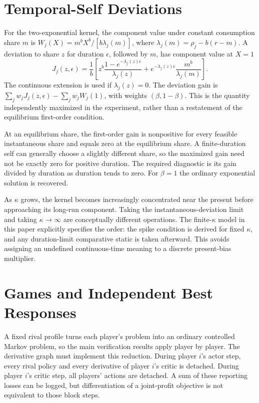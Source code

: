 \documentclass[ecta,nameyear,draft]{econsocart}
\theoremstyle{definition}
\theoremstyle{remark}
\begin{document}
\section{Temporal-Self Deviations}
For the two-exponential kernel, the component value under constant consumption share $m$ is $W_j(X)=m^bX^b/[b\lambda_j(m)]$, where $\lambda_j(m)=\rho_j-b(r-m)$. A deviation to share $z$ for duration $\epsilon$, followed by $m$, has component value at $X=1$
\[
 J_j(z,\epsilon)=\frac1b\left[
 z^b\frac{1-e^{-\lambda_j(z)\epsilon}}{\lambda_j(z)}
 +e^{-\lambda_j(z)\epsilon}\frac{m^b}{\lambda_j(m)}\right].
\]
The continuous extension is used if $\lambda_j(z)=0$. The deviation gain is $\sum_jw_jJ_j(z,\epsilon)-\sum_jw_jW_j(1)$, with weights $(\beta,1-\beta)$. This is the quantity independently maximized in the experiment, rather than a restatement of the equilibrium first-order condition.

At an equilibrium share, the first-order gain is nonpositive for every feasible instantaneous share and equals zero at the equilibrium share. A finite-duration self can generally choose a slightly different share, so the maximized gain need not be exactly zero for positive duration. The required diagnostic is its gain divided by duration as duration tends to zero. For $\beta=1$ the ordinary exponential solution is recovered.

As $\kappa$ grows, the kernel becomes increasingly concentrated near the present before approaching its long-run component. Taking the instantaneous-deviation limit and taking $\kappa\to\infty$ are conceptually different operations. The finite-$\kappa$ model in this paper explicitly specifies the order: the spike condition is derived for fixed $\kappa$, and any duration-limit comparative static is taken afterward. This avoids assigning an undefined continuous-time meaning to a discrete present-bias multiplier.

\section{Games and Independent Best Responses}
A fixed rival profile turns each player's problem into an ordinary controlled Markov problem, so the main verification results apply player by player. The derivative graph must implement this reduction. During player $i$'s actor step, every rival policy and every derivative of player $i$'s critic is detached. During player $i$'s critic step, all players' actions are detached. A sum of these reporting losses can be logged, but differentiation of a joint-profit objective is not equivalent to those block steps.
\end{document}
